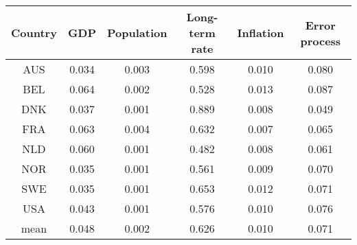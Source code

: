 % 
\begin{tabular}{cccccc}
  \hline
  Country & GDP & Population & Long-term rate & Inflation & Error process\\
 \hline
AUS & 0.034 & 0.003 & 0.598 & 0.010 & 0.080 \\ 
  BEL & 0.064 & 0.002 & 0.528 & 0.013 & 0.087 \\ 
  DNK & 0.037 & 0.001 & 0.889 & 0.008 & 0.049 \\ 
  FRA & 0.063 & 0.004 & 0.632 & 0.007 & 0.065 \\ 
  NLD & 0.060 & 0.001 & 0.482 & 0.008 & 0.061 \\ 
  NOR & 0.035 & 0.001 & 0.561 & 0.009 & 0.070 \\ 
  SWE & 0.035 & 0.001 & 0.653 & 0.012 & 0.071 \\ 
  USA & 0.043 & 0.001 & 0.576 & 0.010 & 0.076 \\ 
  mean & 0.048 & 0.002 & 0.626 & 0.010 & 0.071 \\ 
   \hline
\end{tabular}
